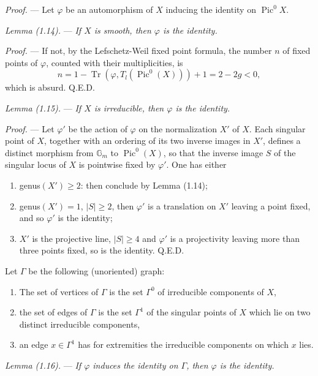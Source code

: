 \documentclass[10pt]{article}
\newcommand{\Pic}{\operatorname{Pic}}
\newcommand{\QED}{\hfill Q.E.D.}
\begin{document}
\noindent\emph{Proof.} --- Let $\varphi$ be an automorphism of $X$ inducing the identity on $\Pic^0X$.

\medskip
\noindent\emph{Lemma (1.14).} --- \emph{If $X$ is smooth, then $\varphi$ is the identity.}

\noindent\emph{Proof.} --- If not, by the Lefschetz-Weil fixed point formula, the number $n$ of fixed points of $\varphi$, counted with their multiplicities, is
\[
n=1-\operatorname{Tr}(\varphi,T_l(\Pic^0(X)))+1=2-2g<0,
\]
which is absurd. \QED

\medskip
\noindent\emph{Lemma (1.15).} --- \emph{If $X$ is irreducible, then $\varphi$ is the identity.}

\noindent\emph{Proof.} --- Let $\varphi'$ be the action of $\varphi$ on the normalization $X'$ of $X$. Each singular point of $X$, together with an ordering of its two inverse images in $X'$, defines a distinct morphism from $\mathbb G_m$ to $\Pic^0(X)$, so that the inverse image $S$ of the singular locus of $X$ is pointwise fixed by $\varphi'$. One has either
\begin{enumerate}[label=\emph{\alph*)}]
\item genus$(X')\geq2$: then conclude by Lemma (1.14);
\item genus$(X')=1$, $|S|\geq2$, then $\varphi'$ is a translation on $X'$ leaving a point fixed, and so $\varphi'$ is the identity;
\item $X'$ is the projective line, $|S|\geq4$ and $\varphi'$ is a projectivity leaving more than three points fixed, so is the identity. \QED
\end{enumerate}


Let $\Gamma$ be the following (unoriented) graph:
\begin{enumerate}[label=(\roman*)]
\item The set of vertices of $\Gamma$ is the set $\Gamma^0$ of irreducible components of $X$,
\item the set of edges of $\Gamma$ is the set $\Gamma^1$ of the singular points of $X$ which lie on two distinct irreducible components,
\item an edge $x\in\Gamma^1$ has for extremities the irreducible components on which $x$ lies.
\end{enumerate}

\medskip
\noindent\emph{Lemma (1.16).} --- \emph{If $\varphi$ induces the identity on $\Gamma$, then $\varphi$ is the identity.}
\end{document}
